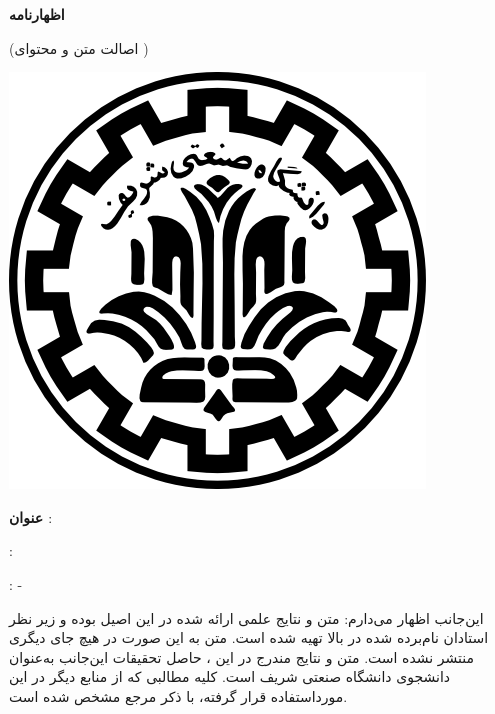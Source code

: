 
{\parindent0pt

\begin{center}
{\large\bf اظهارنامه}

{\small(اصالت متن و محتوای \ThesisType{} \ThesisDegree)}
\end{center}
\vspace{-6em}
\includegraphics[scale=0.15]{front/template/images/logo.png}
\vspace{1em}

\textbf{عنوان ‌\ThesisType}: \ThesisTitle

\vspace{.1em}
\begin{multicols}{2}
	{: \ThesisSupervisor}
	
	{: -}
\end{multicols}

\vspace{0.2em}
این‌جانب {\ThesisAuthor} اظهار می‌دارم: 
 متن و نتایج علمی ارائه شده در این \ThesisType{} اصیل بوده و زیر نظر استادان نام‌برده شده در بالا تهیه شده است.
 متن \ThesisType{} به این صورت در هیچ جای دیگری منتشر نشده است.
 متن و نتایج مندرج در این \ThesisType، حاصل تحقیقات این‌جانب به‌عنوان دانشجوی \ThesisDegree{} دانشگاه صنعتی شریف است.
 کلیه مطالبی که از منابع دیگر در این \ThesisType{} مورداستفاده قرار گرفته، با ذکر مرجع مشخص شده است.

\begin{multicols}{2}
\ \\
\ \\
\ \\


\end{multicols}}
